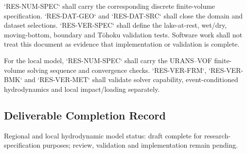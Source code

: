 
`RES-NUM-SPEC` shall carry the corresponding discrete finite-volume
specification. `RES-DAT-GEO` and `RES-DAT-SRC` shall close the domain
and dataset selections. `RES-VER-SPEC` shall define the lake-at-rest,
wet/dry, moving-bottom, boundary and Tōhoku validation tests. Software
work shall not treat this document as evidence that implementation or
validation is complete.

For the local model, `RES-NUM-SPEC` shall carry the URANS--VOF
finite-volume solving sequence and convergence checks. `RES-VER-FRM`,
`RES-VER-BMK` and `RES-VER-MET` shall validate solver capability,
event-conditioned hydrodynamics and local impact/loading separately.

\subsection{Deliverable Completion Record}
\label{sec:res-mod-spec-completion-record}

%
%
%

Regional and local hydrodynamic model status: draft complete for
research-specification purposes; review, validation and implementation
remain pending.
